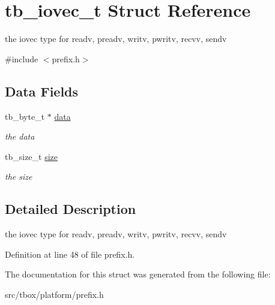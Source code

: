 \hypertarget{structtb__iovec__t}{\section{tb\-\_\-iovec\-\_\-t Struct Reference}
\label{structtb__iovec__t}
}


the iovec type for readv, preadv, writv, pwritv, recvv, sendv  




{\ttfamily \#include $<$prefix.\-h$>$}

\subsection*{Data Fields}
\begin{DoxyCompactItemize}
\item 
\hypertarget{structtb__iovec__t_a363fe40ccb23857ed83f511b25f69f4e}{tb\-\_\-byte\-\_\-t $\ast$ \hyperlink{structtb__iovec__t_a363fe40ccb23857ed83f511b25f69f4e}{data}}\label{structtb__iovec__t_a363fe40ccb23857ed83f511b25f69f4e}

\begin{DoxyCompactList}\small\item\em the data \end{DoxyCompactList}\item 
\hypertarget{structtb__iovec__t_a2b83515c57beb292f0396012367a2c10}{tb\-\_\-size\-\_\-t \hyperlink{structtb__iovec__t_a2b83515c57beb292f0396012367a2c10}{size}}\label{structtb__iovec__t_a2b83515c57beb292f0396012367a2c10}

\begin{DoxyCompactList}\small\item\em the size \end{DoxyCompactList}\end{DoxyCompactItemize}


\subsection{Detailed Description}
the iovec type for readv, preadv, writv, pwritv, recvv, sendv 

Definition at line 48 of file prefix.\-h.



The documentation for this struct was generated from the following file\-:\begin{DoxyCompactItemize}
\item 
src/tbox/platform/prefix.\-h\end{DoxyCompactItemize}
